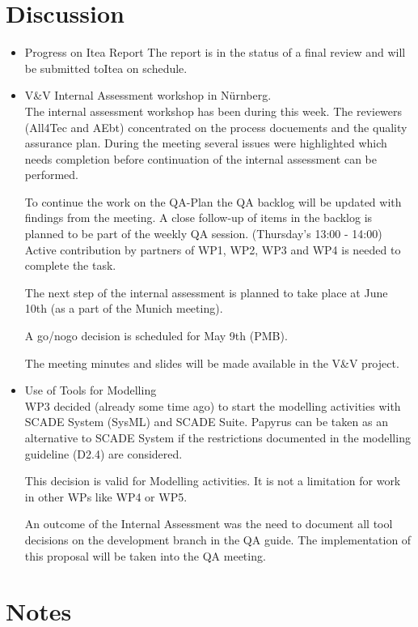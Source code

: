 \documentclass[a4paper, 11pt]{article}
\begin{document}
\section{Discussion}
\begin{itemize}
\item Progress on Itea Report
The report is in the status of a final review and will be submitted toItea on schedule.

\item V\&V Internal Assessment workshop in N\"urnberg.\\
The internal assessment workshop has been during this week. 
The reviewers (All4Tec and AEbt) concentrated on the process docuements and the quality assurance plan. During the meeting several issues were highlighted which needs completion before continuation of the internal assessment can be  performed.

To continue the work on the QA-Plan the QA backlog will be updated with findings from the meeting. A close follow-up of items in the backlog is planned to be part of the weekly QA session. (Thursday's 13:00 - 14:00) Active contribution by partners of WP1, WP2, WP3 and WP4 is needed to complete the task.

The next step of the internal assessment is planned to take place at June 10th (as a part of the Munich meeting).

A go/nogo decision  is scheduled for May 9th (PMB).

The meeting minutes and slides will be made available  in the V\&V project.

\item Use of Tools for Modelling\\
WP3 decided (already some time ago) to start the modelling activities with SCADE System (SysML) and SCADE Suite. Papyrus can be taken as an alternative to SCADE System if the restrictions documented in the modelling guideline (D2.4) are considered.

This decision is valid for Modelling activities. It is not a limitation for work in other WPs like WP4 or WP5.

An outcome of the Internal Assessment was the need to document all tool decisions on the development branch in the QA guide. The implementation of this proposal will be taken into the QA meeting.

\end{itemize}

\section{Notes}
\end{document}
